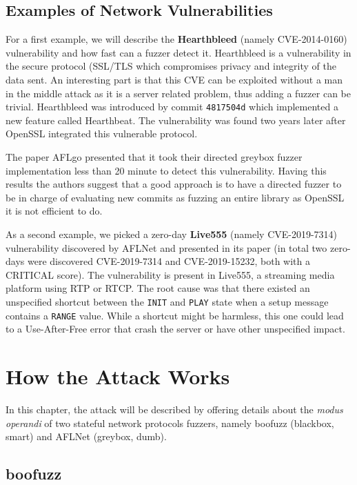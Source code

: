 \documentclass[10pt,a4paper,english,onecolumn]{IEEEtran}
\begin{document}
\subsection{Examples of Network Vulnerabilities}

For a first example, we will describe the \textbf{Hearthbleed} (namely CVE-2014-0160) vulnerability and how fast can a fuzzer detect it. Hearthbleed is a vulnerability in the secure protocol (SSL/TLS which compromises privacy and integrity of the data sent. An interesting part is that this CVE can be exploited without a man in the middle attack as it is a server related problem, thus adding a fuzzer can be trivial. Hearthbleed was introduced by commit \texttt{4817504d} which implemented a new feature called Hearthbeat. The vulnerability was found two years later after OpenSSL integrated this vulnerable protocol.

The paper AFLgo \cite{directed_greybox_fuzzer} presented that it took their directed greybox fuzzer implementation less than 20 minute to detect this vulnerability. Having this results the authors suggest that a good approach is to have a directed fuzzer to be in charge of evaluating new commits as fuzzing an entire library as OpenSSL it is not efficient to do.

As a second example, we picked a zero-day \textbf{Live555} (namely CVE-2019-7314) vulnerability discovered by AFLNet and presented in its paper (in total two zero-days were discovered CVE-2019-7314 and CVE-2019-15232, both with a CRITICAL score). The vulnerability is present in Live555, a streaming media platform using RTP or RTCP. The root cause was that there existed an unspecified shortcut between the \texttt{INIT} and \texttt{PLAY} state when a setup message contains a \texttt{RANGE} value. While a shortcut might be harmless, this one could lead to a Use-After-Free error that crash the server or have other unspecified impact.

\section{How the Attack Works}

In this chapter, the attack will be described by offering details about the \textit{modus operandi} of two stateful network protocols fuzzers, namely boofuzz (blackbox, smart) and AFLNet (greybox, dumb).

\subsection{boofuzz}
\end{document}
